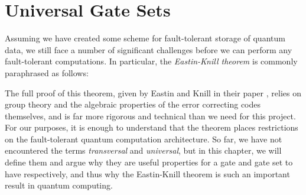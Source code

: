 \section{Universal Gate Sets}\label{sec:universalgates}
Assuming we have created some scheme for fault-tolerant storage of quantum data, we still face a number of significant challenges before we can perform any fault-tolerant computations. In particular, the \emph{Eastin-Knill theorem} \cite{Eastin_2009,eastinknillwiki} is commonly paraphrased as follows:%
\begin{center}
\end{center}

The full proof of this theorem, given by Eastin and Knill in their paper \cite{Eastin_2009}, relies on group theory and the algebraic properties of the error correcting codes themselves, and is far more rigorous and technical than we need for this project. For our purposes, it is enough to understand that the theorem places restrictions on the fault-tolerant quantum computation architecture. So far, we have not encountered the terms \emph{transversal} and \emph{universal}, but in this chapter, we will define them and argue why they are useful properties for a gate and gate set to have respectively, and thus why the Eastin-Knill theorem is such an important result in quantum computing.

